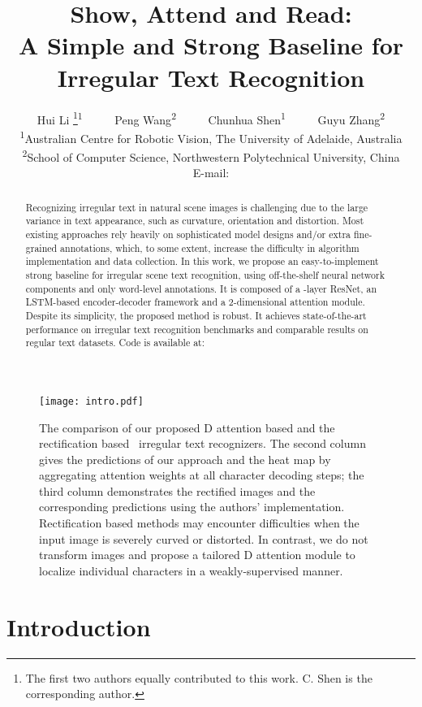 \documentclass[letterpaper]{article} \usepackage{aaai19}  \usepackage{times}  \usepackage{helvet}  \usepackage{courier}  \usepackage{url}  \usepackage{graphicx}  \usepackage{amsmath}
\title{Show, Attend and Read: \\ A Simple and Strong Baseline for Irregular Text Recognition}
\author{
	Hui Li \thanks{The first two authors equally contributed to this work. C. Shen is the corresponding author.
}\textsuperscript{\rm 1}
	~ ~ ~ Peng Wang\textsuperscript{\rm 2}
	~ ~ ~ Chunhua Shen\textsuperscript{\rm 1}
	~ ~ ~ Guyu Zhang\textsuperscript{\rm 2} \\
	\textsuperscript{\rm 1}Australian Centre for Robotic Vision, The University of Adelaide, Australia\\
	\textsuperscript{\rm 2}School of Computer Science,  Northwestern Polytechnical University, China \\
	E-mail: 
}
\begin{document}
\maketitle
\begin{abstract}

Recognizing irregular text in natural scene images is challenging due to the large variance in text appearance, such as curvature, orientation and distortion.
Most existing approaches rely heavily on sophisticated model designs and/or extra fine-grained annotations, which, to some extent, increase the difficulty in algorithm implementation and data collection.
In this work, we propose an easy-to-implement strong baseline for irregular scene text recognition, using off-the-shelf neural network components and only word-level annotations. It is composed of a -layer ResNet, an LSTM-based encoder-decoder framework and a 2-dimensional attention module.
Despite its simplicity, the proposed method is robust. It achieves state-of-the-art performance on irregular text recognition benchmarks and comparable results on regular text datasets.
Code is available at:

	{}
\end{abstract}

\begin{figure}[t!]
	\begin{center}
		\texttt{[image: intro.pdf]}
	\end{center}
	\caption{ The comparison of our proposed D attention based and the rectification based~\cite{shiPAMI2018} irregular text recognizers.
	    The second column gives the predictions of our approach and
		the heat map by aggregating attention weights at all character decoding steps;
		the third column demonstrates the rectified images and the corresponding predictions using the authors' implementation.
		Rectification based methods may encounter difficulties when the input image is severely curved or distorted.
		In contrast, we do not transform images and propose a tailored D attention module to localize individual characters
		in a weakly-supervised manner.
	}
	\label{fig:intro}
\end{figure}

\section{Introduction}
\label{sec:intro}
\end{document}
